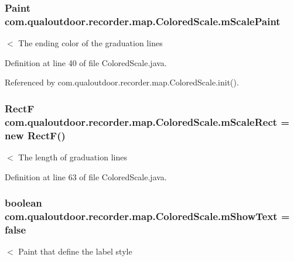 \hypertarget{classcom_1_1qualoutdoor_1_1recorder_1_1map_1_1ColoredScale_a7947eab323f541a31cd1b0eee694aa3d}{
\subsubsection[{m\-Scale\-Paint}]{\setlength{\rightskip}{0pt plus 5cm}Paint com.\-qualoutdoor.\-recorder.\-map.\-Colored\-Scale.\-m\-Scale\-Paint\hspace{0.3cm}{\ttfamily [private]}}}\label{classcom_1_1qualoutdoor_1_1recorder_1_1map_1_1ColoredScale_a7947eab323f541a31cd1b0eee694aa3d}
$<$ The ending color of the graduation lines 

Definition at line 40 of file Colored\-Scale.\-java.



Referenced by com.\-qualoutdoor.\-recorder.\-map.\-Colored\-Scale.\-init().

\hypertarget{classcom_1_1qualoutdoor_1_1recorder_1_1map_1_1ColoredScale_adcbf03acb4ab5e83cdf1d0e3bb3dc900}{
\subsubsection[{m\-Scale\-Rect}]{\setlength{\rightskip}{0pt plus 5cm}Rect\-F com.\-qualoutdoor.\-recorder.\-map.\-Colored\-Scale.\-m\-Scale\-Rect = new Rect\-F()\hspace{0.3cm}{\ttfamily [private]}}}\label{classcom_1_1qualoutdoor_1_1recorder_1_1map_1_1ColoredScale_adcbf03acb4ab5e83cdf1d0e3bb3dc900}
$<$ The length of graduation lines 

Definition at line 63 of file Colored\-Scale.\-java.

\hypertarget{classcom_1_1qualoutdoor_1_1recorder_1_1map_1_1ColoredScale_aa9cb5cdbc2354b01553207fc9ea9015a}{
\subsubsection[{m\-Show\-Text}]{\setlength{\rightskip}{0pt plus 5cm}boolean com.\-qualoutdoor.\-recorder.\-map.\-Colored\-Scale.\-m\-Show\-Text = false\hspace{0.3cm}{\ttfamily [private]}}}\label{classcom_1_1qualoutdoor_1_1recorder_1_1map_1_1ColoredScale_aa9cb5cdbc2354b01553207fc9ea9015a}
$<$ Paint that define the label style 

